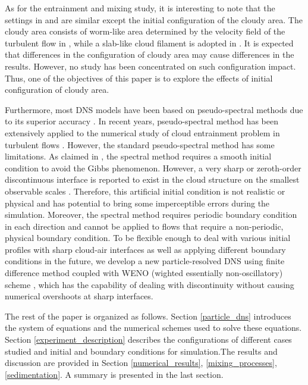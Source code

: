 \documentclass[draft,jgrga]{AGUTeX}
\begin{document}
\begin{article}
As for the entrainment and mixing study, it is interesting to note that the settings in \cite{Kumar11} and \cite{And04} are similar except the initial configuration of the cloudy area. The cloudy area consists of worm-like area determined by the velocity field of the turbulent flow in \cite{And04}, while a slab-like cloud filament is adopted in \cite{Kumar11}. It is expected that differences in the configuration of cloudy area may cause differences in the results. However, no study has been concentrated on such configuration impact. Thus, one of the objectives of this paper is to explore the effects of initial configuration of cloudy area. 

Furthermore, most DNS models have been based on pseudo-spectral methods due to its superior accuracy \cite{Rogallo81,Orszag72}. In recent years, pseudo-spectral method has been extensively applied to the numerical study of cloud entrainment problem in turbulent flows \cite{And04,Celani05,Kumar11}. However, the standard pseudo-spectral method has some limitations. As claimed in \cite{Kumar11}, the spectral method requires a smooth initial condition to avoid the Gibbs phenomenon. However, a very sharp or zeroth-order discontinuous interface is reported to exist in the cloud structure on the smallest observable scales \cite{Brenguier1993}. Therefore, this artificial initial condition is not realistic or physical and has potential to bring some imperceptible errors during the simulation. Moreover, the spectral method requires periodic boundary condition in each direction and cannot be applied to flows that require a non-periodic, physical boundary condition. To be flexible enough to deal with various initial profiles with sharp cloud-air interfaces as well as applying different boundary conditions in the future, we develop a new particle-resolved DNS using finite difference method coupled with WENO (wighted essentially non-oscillatory) scheme \cite{WENO96}, which has the capability of dealing with discontinuity without causing numerical overshoots at sharp interfaces.  

The rest of the paper is organized as follows. Section \ref{particle_dns} 
introduces the system of equations and the numerical schemes used to solve these equations. Section 
\ref{experiment_description} describes the configurations of different cases studied and initial and boundary conditions for simulation.The results and discussion are provided in Section \ref{numerical_results}, \ref{mixing_processes}, \ref{sedimentation}. A summary is presented in the last section. 


\end{article}
\end{document}
